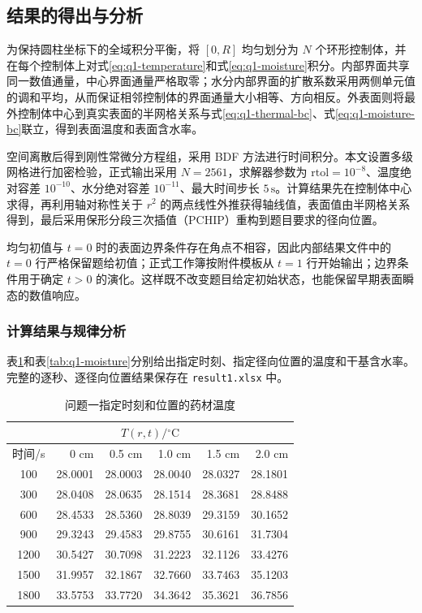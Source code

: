 \subsection{结果的得出与分析}

为保持圆柱坐标下的全域积分平衡，将 $[0,R]$ 均匀划分为 $N$ 个环形控制体，并在每个控制体上对式\eqref{eq:q1-temperature}和式\eqref{eq:q1-moisture}积分。内部界面共享同一数值通量，中心界面通量严格取零；水分内部界面的扩散系数采用两侧单元值的调和平均\cite{patankar1980}，从而保证相邻控制体的界面通量大小相等、方向相反。外表面则将最外控制体中心到真实表面的半网格关系与式\eqref{eq:q1-thermal-bc}、式\eqref{eq:q1-moisture-bc}联立，得到表面温度和表面含水率。

空间离散后得到刚性常微分方程组，采用 BDF 方法进行时间积分\cite{hairer1996}。本文设置多级网格进行加密检验，正式输出采用 $N=2561$，求解器参数为 $\mathrm{rtol}=10^{-8}$、温度绝对容差 $10^{-10}$、水分绝对容差 $10^{-11}$、最大时间步长 $5\,\mathrm{s}$。计算结果先在控制体中心求得，再利用轴对称性关于 $r^2$ 的两点线性外推获得轴线值，表面值由半网格关系得到，最后采用保形分段三次插值（PCHIP）重构到题目要求的径向位置\cite{fritsch1980}。

均匀初值与 $t=0$ 时的表面边界条件存在角点不相容，因此内部结果文件中的 $t=0$ 行严格保留题给初值；正式工作簿按附件模板从 $t=1$ 行开始输出；边界条件用于确定 $t>0$ 的演化。这样既不改变题目给定初始状态，也能保留早期表面瞬态的数值响应。

\subsubsection{计算结果与规律分析}

表\ref{tab:q1-temperature}和表\ref{tab:q1-moisture}分别给出指定时刻、指定径向位置的温度和干基含水率。完整的逐秒、逐径向位置结果保存在 \texttt{result1.xlsx} 中。

\begin{table}[htbp]
\centering
\caption{问题一指定时刻和位置的药材温度}
\label{tab:q1-temperature}
\begin{tabular}{c|rrrrr}
\toprule
\multicolumn{6}{c}{$T(r,t)/{}^\circ\mathrm{C}$}\\
\midrule
时间/s & 0 cm & 0.5 cm & 1.0 cm & 1.5 cm & 2.0 cm \\
\midrule
100  & 28.0001 & 28.0003 & 28.0040 & 28.0327 & 28.1801 \\
300  & 28.0408 & 28.0635 & 28.1514 & 28.3681 & 28.8488 \\
600  & 28.4533 & 28.5360 & 28.8039 & 29.3159 & 30.1652 \\
900  & 29.3243 & 29.4583 & 29.8755 & 30.6161 & 31.7304 \\
1200 & 30.5427 & 30.7098 & 31.2223 & 32.1126 & 33.4276 \\
1500 & 31.9957 & 32.1867 & 32.7660 & 33.7463 & 35.1203 \\
1800 & 33.5753 & 33.7720 & 34.3642 & 35.3621 & 36.7856 \\
\bottomrule
\end{tabular}
\end{table}

